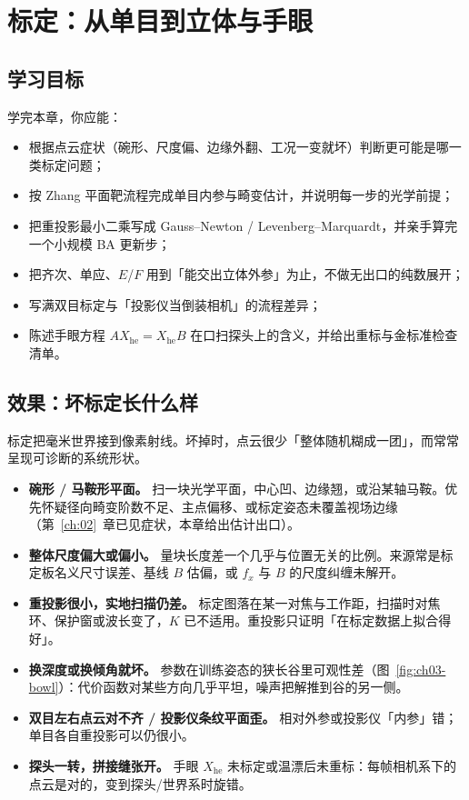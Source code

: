 \chapter{标定：从单目到立体与手眼}
\label{ch:03}

\section{学习目标}

学完本章，你应能：
\begin{itemize}
  \item 根据点云症状（碗形、尺度偏、边缘外翻、工况一变就坏）判断更可能是哪一类标定问题；
  \item 按 Zhang 平面靶流程完成单目内参与畸变估计，并说明每一步的光学前提；
  \item 把重投影最小二乘写成 Gauss--Newton / Levenberg--Marquardt，并亲手算完一个小规模 BA 更新步；
  \item 把齐次、单应、$E$/$F$ 用到「能交出立体外参」为止，不做无出口的纯数展开；
  \item 写满双目标定与「投影仪当倒装相机」的流程差异；
  \item 陈述手眼方程 $A X_{\mathrm{he}}=X_{\mathrm{he}} B$ 在口扫探头上的含义，并给出重标与金标准检查清单。
\end{itemize}

\section{效果：坏标定长什么样}

标定把毫米世界接到像素射线。坏掉时，点云很少「整体随机糊成一团」，而常常呈现可诊断的系统形状。

\begin{itemize}
  \item \textbf{碗形 / 马鞍形平面。} 扫一块光学平面，中心凹、边缘翘，或沿某轴马鞍。优先怀疑径向畸变阶数不足、主点偏移、或标定姿态未覆盖视场边缘（第~\ref{ch:02}~章已见症状，本章给出估计出口）。
  \item \textbf{整体尺度偏大或偏小。} 量块长度差一个几乎与位置无关的比例。来源常是标定板名义尺寸误差、基线 $B$ 估偏，或 $f_x$ 与 $B$ 的尺度纠缠未解开。
  \item \textbf{重投影很小，实地扫描仍差。} 标定图落在某一对焦与工作距，扫描时对焦环、保护窗或波长变了，$K$ 已不适用。重投影只证明「在标定数据上拟合得好」。
  \item \textbf{换深度或换倾角就坏。} 参数在训练姿态的狭长谷里可观性差（图~\ref{fig:ch03-bowl}）：代价函数对某些方向几乎平坦，噪声把解推到谷的另一侧。
  \item \textbf{双目左右点云对不齐 / 投影仪条纹平面歪。} 相对外参或投影仪「内参」错；单目各自重投影可以仍很小。
  \item \textbf{探头一转，拼接缝张开。} 手眼 $X_{\mathrm{he}}$ 未标定或温漂后未重标：每帧相机系下的点云是对的，变到探头/世界系时旋错。
\end{itemize}

